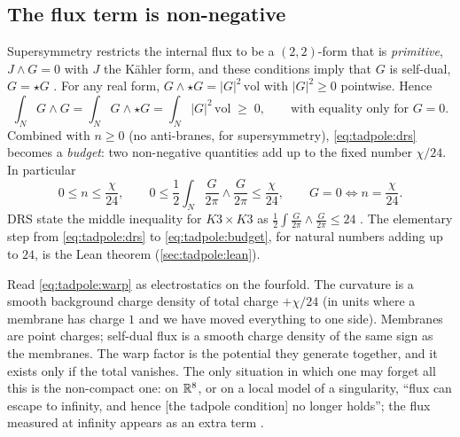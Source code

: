 \subsection{The flux term is non-negative}
Supersymmetry restricts the internal flux to be a $(2,2)$-form that is \emph{primitive},
$J\wedge G=0$ with $J$ the K\"ahler form, and these conditions imply that $G$ is self-dual,
$G=\star G$ .
 For any real form, $G\wedge\star G=|G|^2\,\mathrm{vol}$ with $|G|^2\ge0$
pointwise. Hence
\begin{equation}\label{eq:tadpole:pos}
 \int_NG\wedge G=\int_NG\wedge\star G=\int_N|G|^2\,\mathrm{vol}\;\ge\;0,
 \qquad\text{with equality only for }G=0 .
\end{equation}
Combined with $n\ge0$ (no anti-branes, for supersymmetry), \eqref{eq:tadpole:drs} becomes a
\emph{budget}: two non-negative quantities add up to the fixed number $\chi/24$. In
particular
\begin{equation}\label{eq:tadpole:budget}
 0\le n\le\frac{\chi}{24},\qquad 0\le\frac12\int_N\frac{G}{2\pi}\wedge\frac{G}{2\pi}\le
 \frac{\chi}{24},\qquad G=0\iff n=\frac{\chi}{24}.
\end{equation}
DRS state the middle inequality for $K3\times K3$ as
$\frac12\int\frac G{2\pi}\wedge\frac G{2\pi}\le24$ . The
elementary step from \eqref{eq:tadpole:drs} to \eqref{eq:tadpole:budget}, for natural numbers
adding up to $24$, is the Lean theorem 
(\cref{sec:tadpole:lean}).

\begin{physicsbox}
Read \eqref{eq:tadpole:warp} as electrostatics on the fourfold. The curvature is a smooth
background charge density of total charge $+\chi/24$ (in units where a membrane has charge
$1$ and we have moved everything to one side). Membranes are point charges; self-dual flux
is a smooth charge density of the same sign as the membranes. The warp factor is the
potential they generate together, and it exists only if the total vanishes. The only
situation in which one may forget all this is the non-compact one: on $\mathbb{R}^8$, or on a local
model of a singularity, ``flux can escape to infinity, and hence [the tadpole condition] no
longer holds''; the flux measured at infinity appears as an extra term
.
\end{physicsbox}

